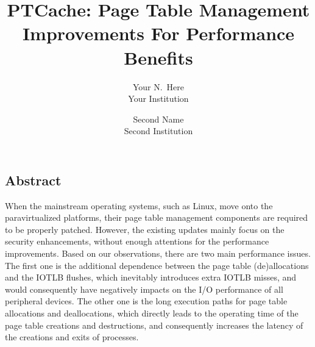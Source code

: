 \documentclass[letterpaper,twocolumn,10pt]{article}
\begin{document}
\newcommand{\name}{PTCache\xspace}
\newcommand{\eat}[1]{}  %
\newcommand{\authcomment}[3]{\textcolor{#3}{#1 says: #2}}\newcommand{\yueqiang}[1]{\authcomment{Yueqiang}{#1}{red}}
\newcommand{\zhi}[1]{\authcomment{Zhi}{#1}{red}}



\date{}

\title{\Large \bf PTCache: Page Table Management Improvements For Performance Benefits }

\author{
{\rm Your N.\ Here}\\
Your Institution
\and
{\rm Second Name}\\
Second Institution
} %

\maketitle

\thispagestyle{empty}


\subsection*{Abstract}
When the mainstream operating systems, such as Linux, move onto the paravirtualized platforms, their page table management components are required to be properly patched.
However, the existing updates mainly focus on the security enhancements, without enough attentions for the performance improvements. 
Based on our observations, there are two main performance issues. 
The first one is the additional dependence between the page table (de)allocations and the IOTLB flushes, which inevitably introduces extra IOTLB misses, and would consequently have negatively impacts on the I/O performance of all peripheral devices.
The other one is the long execution paths for page table allocations and deallocations, which directly leads to the operating time of the page table creations and destructions, and consequently increases the latency of the creations and exits of processes.
\end{document}
